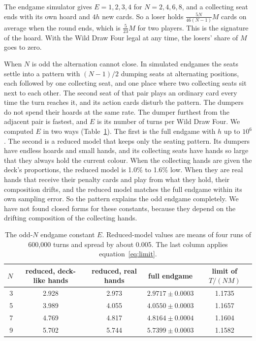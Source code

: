 \documentclass[11pt]{amsart}
\theoremstyle{remark}
\begin{document}
The endgame simulator gives $E=1,2,3,4$ for $N=2,4,6,8$, and a collecting seat ends with its own hoard and $4h$ new cards. So a loser holds $\frac{5N}{46(N-1)}M$ cards on average when the round ends, which is $\frac{5}{23}M$ for two players. This is the signature of the hoard. With the Wild Draw Four legal at any time, the losers' share of $M$ goes to zero.

When $N$ is odd the alternation cannot close. In simulated endgames the seats settle into a pattern with $(N-1)/2$ dumping seats at alternating positions, each followed by one collecting seat, and one place where two collecting seats sit next to each other. The second seat of that pair plays an ordinary card every time the turn reaches it, and its action cards disturb the pattern. The dumpers do not spend their hoards at the same rate. The dumper furthest from the adjacent pair is fastest, and $E$ is its number of turns per Wild Draw Four. We computed $E$ in two ways (Table~\ref{tab:odd}). The first is the full endgame with $h$ up to $10^6$. The second is a reduced model that keeps only the seating pattern. Its dumpers have endless hoards and small hands, and its collecting seats have hands so large that they always hold the current colour. When the collecting hands are given the deck's proportions, the reduced model is 1.0\% to 1.6\% low. When they are real hands that receive their penalty cards and play from what they hold, their composition drifts, and the reduced model matches the full endgame within its own sampling error. So the pattern explains the odd endgame completely. We have not found closed forms for these constants, because they depend on the drifting composition of the collecting hands.

\begin{table}[h]
\centering
\begin{tabular}{rcccc}
\toprule
$N$ & reduced, deck-like hands & reduced, real hands & full endgame & limit of $T/(NM)$ \\
\midrule
3 & 2.928 & 2.973 & $2.9717\pm0.0003$ & 1.1735 \\
5 & 3.989 & 4.055 & $4.0550\pm0.0003$ & 1.1657 \\
7 & 4.769 & 4.817 & $4.8164\pm0.0004$ & 1.1604 \\
9 & 5.702 & 5.744 & $5.7399\pm0.0003$ & 1.1582 \\
\bottomrule
\end{tabular}
\caption{The odd-$N$ endgame constant $E$. Reduced-model values are means of four runs of 600{,}000 turns and spread by about 0.005. The last column applies equation~\eqref{eq:limit}.}
\label{tab:odd}
\end{table}
\end{document}
